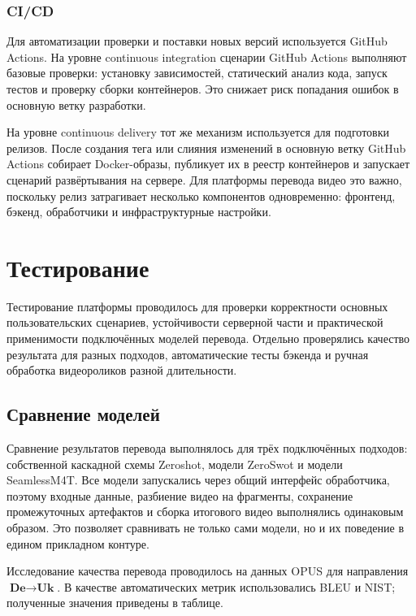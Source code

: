 \documentclass[a4paper,article,14pt]{extarticle}
\begin{document}
\subsubsection{CI/CD}

Для автоматизации проверки и поставки новых версий используется GitHub Actions. На уровне continuous integration сценарии GitHub Actions выполняют базовые проверки: установку зависимостей, статический анализ кода, запуск тестов и проверку сборки контейнеров. Это снижает риск попадания ошибок в основную ветку разработки.

На уровне continuous delivery тот же механизм используется для подготовки релизов. После создания тега или слияния изменений в основную ветку GitHub Actions собирает Docker-образы, публикует их в реестр контейнеров и запускает сценарий развёртывания на сервере. Для платформы перевода видео это важно, поскольку релиз затрагивает несколько компонентов одновременно: фронтенд, бэкенд, обработчики и инфраструктурные настройки.

\newpage
\section{Тестирование}

Тестирование платформы проводилось для проверки корректности основных пользовательских сценариев, устойчивости серверной части и практической применимости подключённых моделей перевода. Отдельно проверялись качество результата для разных подходов, автоматические тесты бэкенда и ручная обработка видеороликов разной длительности.

\subsection{Сравнение моделей}

Сравнение результатов перевода выполнялось для трёх подключённых подходов: собственной каскадной схемы Zeroshot, модели ZeroSwot и модели SeamlessM4T. Все модели запускались через общий интерфейс обработчика, поэтому входные данные, разбиение видео на фрагменты, сохранение промежуточных артефактов и сборка итогового видео выполнялись одинаковым образом. Это позволяет сравнивать не только сами модели, но и их поведение в едином прикладном контуре.

Исследование качества перевода проводилось на данных OPUS для направления $\textbf{De}\!\rightarrow\!\textbf{Uk}$. В качестве автоматических метрик использовались BLEU и NIST; полученные значения приведены в таблице.
\end{document}
